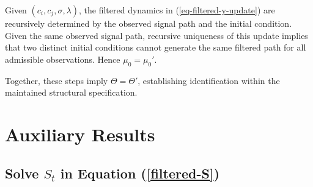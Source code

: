 \documentclass[mnsc]{informs3}
\begin{document}
\begin{APPENDICES}
Given $(c_i,c_j,\sigma,\lambda)$, the filtered dynamics in (\ref{eq-filtered-y-update}) are recursively determined by the observed signal path and the initial condition. 
Given the same observed signal path, recursive uniqueness of this update implies that two distinct initial conditions cannot generate the same filtered path for all admissible observations. 
Hence $\mu_0=\mu_0'$.

Together, these steps imply $\Theta=\Theta'$, establishing identification within the maintained structural specification.
\Halmos
\endproof






\section{Auxiliary Results}

\subsection{Solve $S_t$ in Equation (\ref{filtered-S})}\label{app-S-equ}


\end{APPENDICES}
\end{document}
